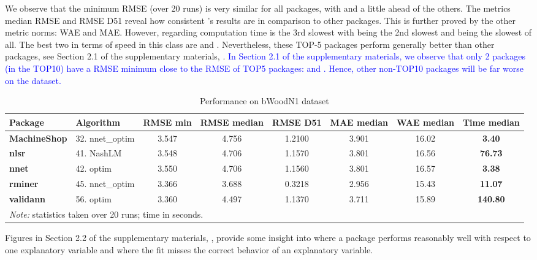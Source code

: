 We observe that the minimum RMSE (over 20 runs) is very similar for all
packages, with  and  a little ahead of the
others. The metrics median RMSE and RMSE D51 reveal how consistent
's results are in comparison to other packages. This is
further proved by the other metric norms: WAE and MAE. However,
regarding computation time  is the 3rd slowest with
 being the 2nd slowest and  being the slowest of
all. The best two in terms of speed in this class are  and
. Nevertheless, these TOP-5 packages perform generally
better than other packages, see Section 2.1 of the supplementary
materials, \citep{suppl:material:paper21}.
\textcolor{blue}{In Section 2.1 of the supplementary materials, we observe that only 
2 packages (in the TOP10) have a RMSE minimum close to the RMSE of TOP5 packages: 
and . Hence, other non-TOP10 packages will be far worse
on the  dataset.}

\begin{Schunk}
\begin{table}

\caption{\label{tab:TOP10:bWoodN1}Performance on bWoodN1 dataset}
\centering
\fontsize{7}{9}\selectfont
\begin{tabular}[t]{>{}llccccc>{}c}
\toprule
Package & Algorithm & RMSE min & RMSE median & RMSE D51 & MAE median & WAE median & Time median\\
\midrule
\textbf{MachineShop} & 32. nnet\_optim & 3.547 & 4.756 & 1.2100 & 3.901 & 16.02 & \textbf{3.40}\\
\textbf{nlsr} & 41. NashLM & 3.548 & 4.706 & 1.1570 & 3.801 & 16.56 & \textbf{76.73}\\
\textbf{nnet} & 42. optim & 3.550 & 4.706 & 1.1560 & 3.801 & 16.57 & \textbf{3.38}\\
\textbf{rminer} & 45. nnet\_optim & 3.366 & 3.688 & 0.3218 & 2.956 & 15.43 & \textbf{11.07}\\
\textbf{validann} & 56. optim & 3.360 & 4.497 & 1.1370 & 3.711 & 15.89 & \textbf{140.80}\\
\bottomrule
\multicolumn{8}{l}{\rule{0pt}{1em}\textit{Note: } statistics taken over 20 runs; time in seconds.}\\
\end{tabular}
\end{table}

\end{Schunk}

Figures in Section 2.2 of the supplementary materials,
\citep{suppl:material:paper21}, provide some insight into where a
package performs reasonably well with respect to one explanatory
variable and where the fit misses the correct behavior of an explanatory
variable.

